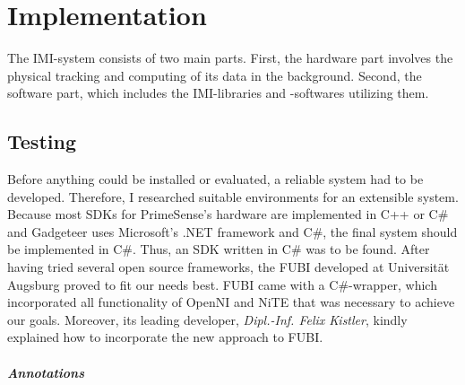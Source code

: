 \chapter{Implementation}
\label{implementation}

The \ac{IMI}-system consists of two main parts. First, the hardware part involves the physical tracking and computing of its data in the background. Second, the software part, which includes the \ac{IMI}-libraries and -softwares utilizing them.

%


\section{Testing}
\label{conception_testing}

Before anything could be installed or evaluated, a reliable system had to be developed. Therefore, I researched suitable environments for an extensible system. Because most \ac{SDK}s for PrimeSense's hardware are implemented in C++ or C$\#$ and Gadgeteer uses Microsoft's .NET framework and C$\#$, the final system should be implemented in C$\#$. Thus, an \ac{SDK} written in C$\#$ was to be found. After having tried several open source frameworks, the \ac{FUBI} developed at Universität Augsburg proved to fit our needs best. \ac{FUBI} came with a C$\#$-wrapper, which incorporated all functionality of OpenNI and NiTE that was necessary to achieve our goals. Moreover, its leading developer, \textit{Dipl.-Inf. Felix Kistler}, kindly explained how to incorporate the new approach to \ac{FUBI}.  

\paragraph{Annotations}

